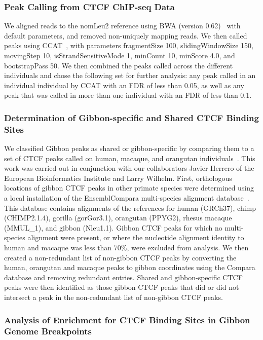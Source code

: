 \subsubsection{Peak Calling from CTCF ChIP-seq Data}

We aligned reads to the nomLeu2 reference using BWA (version 0.62)~\cite{Li:2009p836} with default parameters, and removed non-uniquely mapping reads. We then called peaks using CCAT~\cite{Xu:2010fu}, with parameters fragmentSize 100, slidingWindowSize 150, movingStep 10, isStrandSensitiveMode 1, minCount 10, minScore 4.0, and bootstrapPass 50. We then combined the peaks called across the different individuals and chose the following set for further analysis: any peak called in an individual individual by CCAT with an FDR of less than 0.05, as well as any peak that was called in more than one individual with an FDR of less than 0.1. 

\subsubsection{Determination of Gibbon-specific and Shared CTCF Binding Sites}

We classified Gibbon peaks as shared or gibbon-specific by comparing them to a set of CTCF peaks called on human, macaque, and orangutan individuals~\cite{Schwalie:2014}. This work was carried out in conjunction with our collaborators Javier Herrero of the European Bioinformatics Institute and Larry Wilhelm. First, orthologous locations of gibbon CTCF peaks in other primate species were determined using a local installation of the EnsemblCompara multi-species alignment database~\cite{ensembl_compara,Vilella:2009ju}. This database contains alignments of the references for human (GRCh37), chimp (CHIMP2.1.4), gorilla (gorGor3.1), orangutan (PPYG2), rhesus macaque (MMUL\_1), and gibbon (Nleu1.1). Gibbon CTCF peaks for which no multi-species alignment were present, or where the nucleotide alignment identity to human and macaque was less than 70\%, were excluded from analysis. We then created a non-redundant list of non-gibbon CTCF peaks by converting the human, orangutan and macaque peaks to gibbon coordinates using the Compara database and removing redundant entries. Shared and gibbon-specific CTCF peaks were then identified as those gibbon CTCF peaks that did or did not intersect a peak in the non-redundant list of non-gibbon CTCF peaks.

\subsubsection{Analysis of Enrichment for CTCF Binding Sites in Gibbon Genome Breakpoints}

